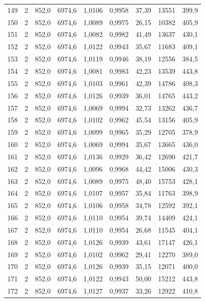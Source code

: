 \documentclass[11pt,a4paper]{article}
\begin{document}
{\begin{longtable}{r c r r r r r r r}
149 & 2 & 852,0 & 6974,6 & 1,0106 & 0,9958 & 37,39 & 13551 & 399,9 \\
150 & 2 & 852,0 & 6974,6 & 1,0089 & 0,9975 & 26,15 & 10382 & 405,9 \\
151 & 2 & 852,0 & 6974,6 & 1,0082 & 0,9982 & 41,49 & 13637 & 430,1 \\
152 & 2 & 852,0 & 6974,6 & 1,0122 & 0,9943 & 35,67 & 11683 & 409,1 \\
153 & 2 & 852,0 & 6974,6 & 1,0119 & 0,9946 & 38,19 & 12556 & 384,5 \\
154 & 2 & 852,0 & 6974,6 & 1,0081 & 0,9983 & 42,23 & 13539 & 443,8 \\
155 & 2 & 852,0 & 6974,6 & 1,0103 & 0,9961 & 42,39 & 14786 & 408,3 \\
156 & 2 & 852,0 & 6974,6 & 1,0126 & 0,9939 & 36,01 & 14765 & 443,2 \\
157 & 2 & 852,0 & 6974,6 & 1,0069 & 0,9994 & 32,73 & 13262 & 436,7 \\
158 & 2 & 852,0 & 6974,6 & 1,0102 & 0,9962 & 45,54 & 13156 & 405,9 \\
159 & 2 & 852,0 & 6974,6 & 1,0099 & 0,9965 & 35,29 & 12705 & 378,9 \\
160 & 2 & 852,0 & 6974,6 & 1,0069 & 0,9994 & 35,67 & 13665 & 436,0 \\
161 & 2 & 852,0 & 6974,6 & 1,0136 & 0,9929 & 36,42 & 12690 & 421,7 \\
162 & 2 & 852,0 & 6974,6 & 1,0096 & 0,9968 & 44,42 & 15006 & 430,3 \\
163 & 2 & 852,0 & 6974,6 & 1,0089 & 0,9975 & 48,40 & 15753 & 428,1 \\
164 & 2 & 852,0 & 6974,6 & 1,0107 & 0,9957 & 35,84 & 11763 & 398,9 \\
165 & 2 & 852,0 & 6974,6 & 1,0106 & 0,9958 & 34,78 & 12592 & 392,1 \\
166 & 2 & 852,0 & 6974,6 & 1,0110 & 0,9954 & 39,74 & 14409 & 424,1 \\
167 & 2 & 852,0 & 6974,6 & 1,0110 & 0,9954 & 26,68 & 11545 & 404,1 \\
168 & 2 & 852,0 & 6974,6 & 1,0126 & 0,9939 & 43,61 & 17147 & 426,1 \\
169 & 2 & 852,0 & 6974,6 & 1,0102 & 0,9962 & 29,41 & 12270 & 389,0 \\
170 & 2 & 852,0 & 6974,6 & 1,0126 & 0,9939 & 35,15 & 12071 & 400,0 \\
171 & 2 & 852,0 & 6974,6 & 1,0122 & 0,9943 & 50,00 & 15212 & 443,8 \\
172 & 2 & 852,0 & 6974,6 & 1,0127 & 0,9937 & 33,26 & 12922 & 410,8 \\

\end{longtable}}
\end{document}
